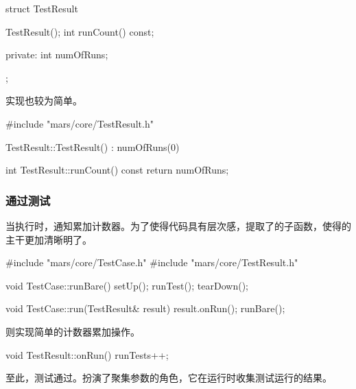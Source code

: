 \begin{content}
\begin{leftbar}
 \begin{c++}[caption={\ttfamily{include/mars/core/TestResult.h}}]
struct TestResult {
  TestResult();
  int runCount() const;

private:
  int numOfRuns;
};
 \end{c++}
\end{leftbar}

实现也较为简单。

\begin{leftbar}
 \begin{c++}[caption={\ttfamily{src/mars/core/TestResult.cc}}]
#include "mars/core/TestResult.h"

TestResult::TestResult() : numOfRuns(0) {
}

int TestResult::runCount() const {
  return numOfRuns;
}
 \end{c++}
\end{leftbar}

\subsubsection{通过测试}

当执行时，通知累加计数器。为了使得代码具有层次感，提取了的子函数，使得的主干更加清晰明了。

\begin{leftbar}
 \begin{c++}[caption={\ttfamily{src/mars/core/TestCase.cc}}]
#include "mars/core/TestCase.h"
#include "mars/core/TestResult.h"

void TestCase::runBare() {
  setUp();
  runTest();
  tearDown();
}

void TestCase::run(TestResult& result) {
  result.onRun();
  runBare();
}
 \end{c++}
\end{leftbar}

则实现简单的计数器累加操作。

\begin{leftbar}
 \begin{c++}[caption={\ttfamily{src/mars/core/TestResult.cc}}]
void TestResult::onRun() {
  runTests++;
}
 \end{c++}
\end{leftbar}

至此，测试通过。扮演了聚集参数的角色，它在运行时收集测试运行的结果。


\end{content}
